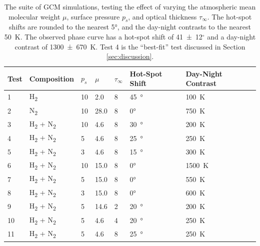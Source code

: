 \begin{table}[]
\begin{tabular}{l|llll|ll}
\textbf{Test} & \textbf{Composition} & $p_{s}$ & $\mu$  & $\tau_{\infty}$ & \textbf{Hot-Spot Shift} & \textbf{Day-Night Contrast} \\
\hline
 1    & H\textsubscript{2}  & 10   & 2.0  & 8 & \SI[retain-explicit-plus]{+45}{\degree} & \SI{100}{\kelvin}  \\
 2    & N\textsubscript{2}  & 10   & 28.0  & 8 & \ang{0} & \SI{750}{\kelvin}  \\
 3    & H\textsubscript{2} + N\textsubscript{2}  & 10   & 4.6  & 8 &  \SI[retain-explicit-plus]{+30}{\degree} & \SI{200}{\kelvin}  \\
 4    & H\textsubscript{2} + N\textsubscript{2}  & 5   & 4.6  & 8 &  \SI[retain-explicit-plus]{+25}{\degree} & \SI{250}{\kelvin}  \\
 5    & H\textsubscript{2} + N\textsubscript{2}  & 3   & 4.6  & 8 &  \SI[retain-explicit-plus]{+15}{\degree} & \SI{300}{\kelvin}  \\
 6    & H\textsubscript{2} + N\textsubscript{2}  & 10   & 15.0 & 8 & \ang{0}& \SI{1500}{\kelvin}  \\
 7    & H\textsubscript{2} + N\textsubscript{2}  & 5   & 15.0  & 8 & \ang{0}& \SI{550}{\kelvin}  \\
 8    & H\textsubscript{2} + N\textsubscript{2}  & 3   & 15.0  & 8 & \ang{0}& \SI{600}{\kelvin}  \\
 9    & H\textsubscript{2} + N\textsubscript{2}  & 5   & 14.6  & 2 &  \SI[retain-explicit-plus]{+20}{\degree} & \SI{200}{\kelvin}  \\
 10    & H\textsubscript{2} + N\textsubscript{2}  & 5   & 4.6  & 4 &  \SI[retain-explicit-plus]{+20}{\degree} & \SI{250}{\kelvin}  \\
11    & H\textsubscript{2} + N\textsubscript{2}  & 5   & 4.6  & 8 &  \SI[retain-explicit-plus]{+25}{\degree} & \SI{250}{\kelvin}
\end{tabular}
\caption{The suite of GCM simulations, testing the effect of varying the atmospheric mean molecular weight $\mu$, surface pressure $p_{s}$, and optical thickness $\tau_{\infty}$. The hot-spot shifts are rounded to the nearest \ang{5}, and the day-night contrasts to the nearest \SI{50}{\kelvin}. The observed phase curve has a hot-spot shift of \SI[separate-uncertainty = true,retain-explicit-plus]{+41(12)}{}$^\circ$ and a day-night contrast of \SI[separate-uncertainty = true]{1300(670)}{\kelvin}. Test 4 is the ``best-fit'' test discussed in Section \ref{sec:discussion}.}\label{tab:gcm-test-suite}
\end{table}



